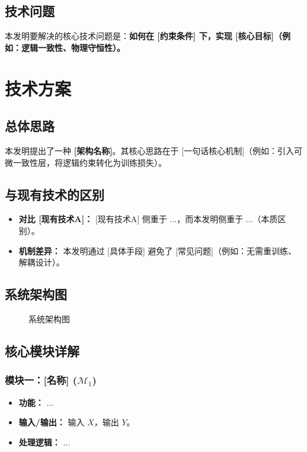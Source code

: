 \documentclass[a4paper,12pt]{article}
\begin{document}
\subsection{技术问题}
本发明要解决的核心技术问题是：\textbf{如何在 [约束条件] 下，实现 [核心目标]（例如：逻辑一致性、物理守恒性）。}

\section{技术方案}

\subsection{总体思路}
本发明提出了一种 \textbf{[架构名称]}。其核心思路在于 [一句话核心机制]（例如：引入可微一致性层，将逻辑约束转化为训练损失）。

\subsection{与现有技术的区别}
\begin{itemize}
    \item \textbf{对比 [现有技术A]：} [现有技术A] 侧重于 ...，而本发明侧重于 ...（本质区别）。
    \item \textbf{机制差异：} 本发明通过 [具体手段] 避免了 [常见问题]（例如：无需重训练、解耦设计）。
\end{itemize}

\subsection{系统架构图}
\begin{figure}[H]
    \centering
    \caption{系统架构图}
    \label{fig:architecture}
\end{figure}

\subsection{核心模块详解}

\subsubsection{模块一：[名称] ($\mathcal{M}_1$)}
\begin{itemize}
    \item \textbf{功能：} ...
    \item \textbf{输入/输出：} 输入 $X$，输出 $Y$。
    \item \textbf{处理逻辑：} ...
\end{itemize}
\end{document}
